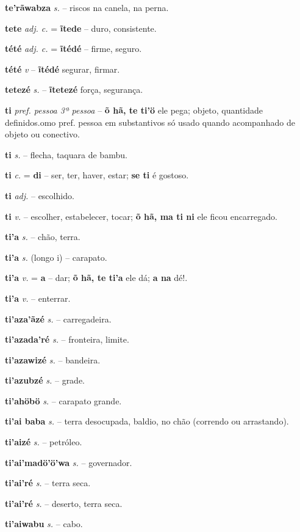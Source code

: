 \textbf{te'rãwabza} \textit{s.} -- riscos na canela, na perna.

\textbf{tete} \textit{adj. c.} = \textbf{ĩtede} -- duro, consistente.

\textbf{tété} \textit{adj. c.} = \textbf{ĩtédé} -- firme, seguro.

\textbf{tété} \textit{v} -- \textbf{ĩtédé} segurar, firmar.

\textbf{tetezé} \textit{s.} -- \textbf{ĩtetezé} força, segurança.

\textbf{ti} \textit{pref. pessoa 3ª pessoa} -- \textbf{õ hã, te ti'ö} ele pega; objeto, quantidade definidos.omo pref. pessoa em substantivos só usado quando acompanhado de objeto ou conectivo.

\textbf{ti} \textit{s.} -- flecha, taquara de bambu.

\textbf{ti} \textit{c.} = \textbf{di} -- ser, ter, haver, estar; \textbf{se ti} é gostoso.

\textbf{ti} \textit{adj.} -- escolhido.

\textbf{ti} \textit{v.} -- escolher, estabelecer, tocar; \textbf{õ hã, ma ti ni} ele ficou encarregado.

\textbf{ti'a} \textit{s.} -- chão, terra.

\textbf{ti'a} \textit{s.} (longo i) -- carapato.

\textbf{ti'a} \textit{ v.} = \textbf{a} -- dar; \textbf{õ hã, te ti'a} ele dá; \textbf{a na} dé!.

\textbf{ti'a} \textit{ v.} -- enterrar.

\textbf{ti'aza'ãzé} \textit{s.} -- carregadeira.

\textbf{ti'azada'ré} \textit{s.} -- fronteira, limite.

\textbf{ti'azawizé} \textit{s.} -- bandeira.

\textbf{ti'azubzé} \textit{s.} -- grade.

\textbf{ti'ahöbö} \textit{s.} -- carapato grande.

\textbf{ti'ai baba} \textit{s.} -- terra desocupada, baldio, no chão (correndo ou arrastando).

\textbf{ti'aizé} \textit{s.} -- petróleo.

\textbf{ti'ai'madö'ö'wa} \textit{s.} -- governador.

\textbf{ti'ai'ré} \textit{s.} -- terra seca.

\textbf{ti'ai'ré} \textit{s.} -- deserto, terra seca.

\textbf{ti'aiwabu} \textit{s.} -- cabo.

